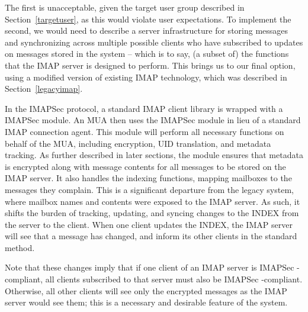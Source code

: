 \documentclass[pageno]{jpaper}
\newcommand{\project}{IMAPSec }
\begin{document}
The first is unacceptable, given the target user group described in Section~\ref{targetuser}, as this would violate user expectations. To implement the second, we would need to describe a server infrastructure for storing messages and synchronizing across multiple possible clients who have subscribed to updates on messages stored in the system -- which is to say, (a subset of) the functions that the IMAP server is designed to perform. This brings us to our final option, using a modified version of existing IMAP technology, which was described in Section~\ref{legacyimap}.

In the \project protocol, a standard IMAP client library is wrapped with a \project module. An MUA then uses the \project module in lieu of a standard IMAP connection agent. This module will perform all necessary functions on behalf of the MUA, including encryption, UID translation, and metadata tracking.
As further described in later sections, the module ensures that metadata is encrypted along with message contents for all messages to be stored on the IMAP server. It also handles the indexing functions, mapping mailboxes to the messages they complain. This is a significant departure from the legacy system, where mailbox names and contents were exposed to the IMAP server. As such, it shifts the burden of tracking, updating, and syncing changes to the INDEX from the server to the client. When one client updates the INDEX, the IMAP server will see that a message has changed, and inform its other clients in the standard method. 


Note that these changes imply that if one client of an IMAP server is \project-compliant, all clients subscribed to that server must also be \project-compliant. Otherwise, all other clients will see only the encrypted messages as the IMAP server would see them; this is a necessary and desirable feature of the system.
\end{document}
